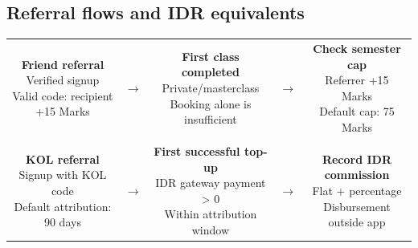 \documentclass[11pt,a4paper]{article}
\newcommand{\flowbox}[2]{\fbox{\parbox[c]{#1}{\centering\small #2}}}
\begin{document}
\subsection*{Referral flows and IDR equivalents}

\begin{center}
\begin{tabular}{@{}c@{\;}c@{\;}c@{\;}c@{\;}c@{}}
\flowbox{43mm}{\textbf{Friend referral}\\Verified signup\\Valid code: recipient +15 Marks} & $\rightarrow$ & \flowbox{43mm}{\textbf{First class completed}\\Private/masterclass\\Booking alone is insufficient} & $\rightarrow$ & \flowbox{43mm}{\textbf{Check semester cap}\\Referrer +15 Marks\\Default cap: 75 Marks} \\
\multicolumn{5}{c}{\rule{0pt}{5mm}} \\
\flowbox{43mm}{\textbf{KOL referral}\\Signup with KOL code\\Default attribution: 90 days} & $\rightarrow$ & \flowbox{43mm}{\textbf{First successful top-up}\\IDR gateway payment > 0\\Within attribution window} & $\rightarrow$ & \flowbox{43mm}{\textbf{Record IDR commission}\\Flat + percentage\\Disbursement outside app} \\
\end{tabular}
\end{center}
\end{document}
